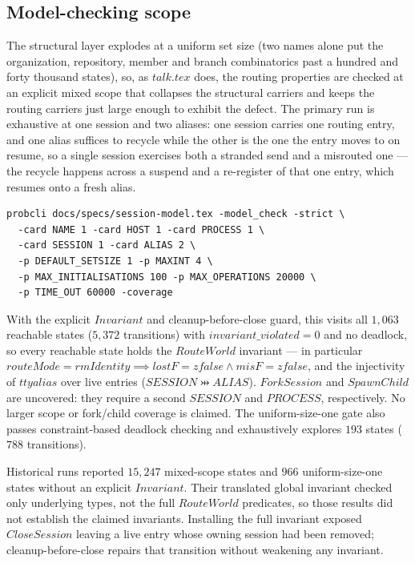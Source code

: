 \documentclass[a4paper,10pt,fleqn]{article}
\begin{document}
\subsection{Model-checking scope}

The structural layer explodes at a uniform set size (two names alone put
the organization, repository, member and branch combinatorics past a
hundred and forty thousand states), so, as $talk.tex$ does, the routing
properties are checked at an explicit mixed scope that collapses the
structural carriers and keeps the routing carriers just large enough to
exhibit the defect.  The primary run is exhaustive at one session and two
aliases: one session carries one routing entry, and one alias suffices
to recycle while the other is the one the entry moves to on resume, so a
single session exercises both a stranded send and a misrouted one --- the
recycle happens across a suspend and a re-register of that one entry,
which resumes onto a fresh alias.

\begin{verbatim}
probcli docs/specs/session-model.tex -model_check -strict \
  -card NAME 1 -card HOST 1 -card PROCESS 1 \
  -card SESSION 1 -card ALIAS 2 \
  -p DEFAULT_SETSIZE 1 -p MAXINT 4 \
  -p MAX_INITIALISATIONS 100 -p MAX_OPERATIONS 20000 \
  -p TIME_OUT 60000 -coverage
\end{verbatim}

With the explicit $Invariant$ and cleanup-before-close guard, this visits
all $1{,}063$ reachable states ($5{,}372$ transitions) with
$invariant\_violated = 0$ and no deadlock, so every reachable state holds
the $RouteWorld$ invariant --- in particular $routeMode = rmIdentity
\implies lostF = zfalse \land misF = zfalse$, and the injectivity of
$ttyalias$ over live entries ($SESSION \pinj ALIAS$).  $ForkSession$ and $SpawnChild$ are uncovered:
they require a second $SESSION$ and $PROCESS$, respectively.  No larger
scope or fork/child coverage is claimed.  The uniform-size-one gate also
passes constraint-based deadlock checking and exhaustively explores
$193$ states ($788$ transitions).

Historical runs reported $15{,}247$ mixed-scope states and $966$
uniform-size-one states without an explicit $Invariant$.  Their translated
global invariant checked only underlying types, not the full $RouteWorld$
predicates, so those results did not establish the claimed invariants.
Installing the full invariant exposed $CloseSession$ leaving a live entry
whose owning session had been removed; cleanup-before-close repairs that
transition without weakening any invariant.
\end{document}
